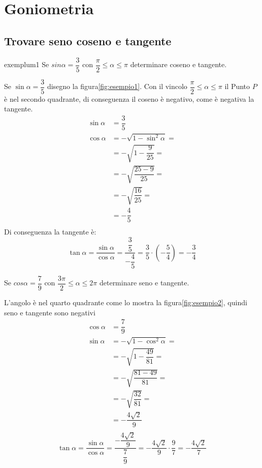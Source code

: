 \chapter{Goniometria}
\label{cha:goniometriaEss}
\section{Trovare seno coseno e tangente}
\begin{esempiot}{}{exemplum1}
	Se $sin\alpha=\dfrac{3}{5}$ con $\dfrac{\pi}{2}\leq\alpha\leq\pi$ determinare coseno e tangente.
\end{esempiot}
Se $\sin\alpha=\dfrac{3}{5}$ disegno la figura\nobs\vref{fig:esempio1}. Con il vincolo $\dfrac{\pi}{2}\leq\alpha\leq\pi$ il Punto $P$ è nel secondo quadrante, di conseguenza il coseno è negativo, come è negativa la tangente.
\begin{align*}
\sin\alpha&=\dfrac{3}{5}\\
\cos\alpha&=-\sqrt{1-\sin^2\alpha}=\\
&=-\sqrt{1-\dfrac{9}{25}}=\\
&=-\sqrt{\dfrac{25-9}{25}}=\\
&=-\sqrt{\dfrac{16}{25}}=\\
&=-\dfrac{4}{5}\\
\end{align*}
Di conseguenza la tangente è:
\[\tan\alpha=\dfrac{\sin\alpha}{\cos\alpha}=\dfrac{\dfrac{3}{5}}{-\dfrac{4}{5}}=\dfrac{3}{5}\cdot\left(-\dfrac{5}{4}\right)=-\dfrac{3}{4}\]
\begin{esempiot}{}{}
	Se $cos\alpha=\dfrac{7}{9}$ con $\dfrac{3\pi}{2}\leq\alpha\leq 2\pi$ determinare seno e tangente.
\end{esempiot}
L'angolo è nel quarto quadrante come lo mostra la figura\nobs\vref{fig:esempio2}, quindi seno e tangente sono negativi
\begin{align*}
\cos\alpha&=\dfrac{7}{9}\\
\sin\alpha&=-\sqrt{1-\cos^2\alpha}=\\
&=-\sqrt{1-\dfrac{49}{81}}=\\
&=-\sqrt{\dfrac{81-49}{81}}=\\
&=-\sqrt{\dfrac{32}{81}}=\\
&=-\dfrac{4\sqrt{2}}{9}\\
\end{align*}
\[\tan\alpha=\dfrac{\sin\alpha}{\cos\alpha}=\dfrac{-\dfrac{4\sqrt{2}}{9}}{\dfrac{7}{9}}=-\dfrac{4\sqrt{2}}{9}\cdot\dfrac{9}{7}=-\dfrac{4\sqrt{2}}{7}\]
